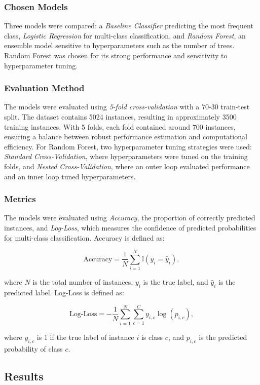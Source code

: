 \documentclass[fleqn,moreauthors,10pt]{ds_report}
\begin{document}
\subsubsection*{Chosen Models}
Three models were compared: a \textit{Baseline Classifier} predicting the most frequent class, \textit{Logistic Regression} for multi-class classification, and \textit{Random Forest}, an ensemble model sensitive to hyperparameters such as the number of trees. Random Forest was chosen for its strong performance and sensitivity to hyperparameter tuning.

\subsubsection*{Evaluation Method}
The models were evaluated using \textit{5-fold cross-validation} with a 70-30 train-test split. The dataset contains 5024 instances, resulting in approximately 3500 training instances. With 5 folds, each fold contained around 700 instances, ensuring a balance between robust performance estimation and computational efficiency. For Random Forest, two hyperparameter tuning strategies were used: \textit{Standard Cross-Validation}, where hyperparameters were tuned on the training folds, and \textit{Nested Cross-Validation}, where an outer loop evaluated performance and an inner loop tuned hyperparameters.

\subsubsection*{Metrics}
The models were evaluated using \textit{Accuracy}, the proportion of correctly predicted instances, and \textit{Log-Loss}, which measures the confidence of predicted probabilities for multi-class classification. Accuracy is defined as:

\[
\text{Accuracy} = \frac{1}{N} \sum_{i=1}^N \mathbb{I}(y_i = \hat{y}_i),
\]

where \( N \) is the total number of instances, \( y_i \) is the true label, and \( \hat{y}_i \) is the predicted label. Log-Loss is defined as:

\[
\text{Log-Loss} = -\frac{1}{N} \sum_{i=1}^N \sum_{c=1}^C y_{i,c} \log(p_{i,c}),
\]

where \( y_{i,c} \) is 1 if the true label of instance \( i \) is class \( c \), and \( p_{i,c} \) is the predicted probability of class \( c \).

\subsection*{Results}
\end{document}
